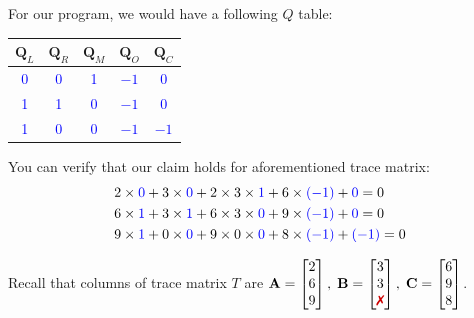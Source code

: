 \documentclass[../../book.tex]{subfiles}
\begin{document}
\begin{example}

For our program, we would have a following $Q$ table:
\begin{center}
\begin{tabular}{|c|c|c|c|c|}
\hline
\rowcolor{gray!30}$\mathbf{Q}_L$ & $\mathbf{Q}_R$ & $\mathbf{Q}_M$ & $\mathbf{Q}_O$ & $\mathbf{Q}_C$ \\ 
\hline
\textcolor{blue}{0} & \textcolor{blue}{0} & \textcolor{blue}{1} & \textcolor{blue}{$-1$} & \textcolor{blue}{0} \\ 
\hline
\textcolor{blue}{1} & \textcolor{blue}{1} & \textcolor{blue}{0} & \textcolor{blue}{$-1$} & \textcolor{blue}{0} \\ 
\hline
\textcolor{blue}{1} & \textcolor{blue}{0} & \textcolor{blue}{0} & \textcolor{blue}{$-1$} & \textcolor{blue}{$-1$} \\ 
\hline
\end{tabular}
\end{center}

You can verify that our claim holds for aforementioned trace matrix:
\begin{align*}
  &2 \times \textcolor{blue}{0} + 3 \times \textcolor{blue}{0} + 2 \times 3 \times \textcolor{blue}{1} + 6 \times \textcolor{blue}{(-1)} + \textcolor{blue}{0} = 0 \\
  &6 \times \textcolor{blue}{1} + 3 \times \textcolor{blue}{1} + 6 \times 3 \times \textcolor{blue}{0} + 9 \times \textcolor{blue}{(-1)} + \textcolor{blue}{0} = 0 \\
  &9 \times \textcolor{blue}{1} + 0 \times \textcolor{blue}{0} + 9 \times 0 \times \textcolor{blue}{0} + 8 \times \textcolor{blue}{(-1)} + \textcolor{blue}{(-1)} = 0 
\end{align*}

Recall that columns of trace matrix $T$ are $\mathbf{A} = \begin{bmatrix} 2 \\ 6 \\ 9 \end{bmatrix}, \;\mathbf{B} = \begin{bmatrix} 3 \\ 3 \\ \text{\xmark} \end{bmatrix}, \;\mathbf{C} = \begin{bmatrix} 6 \\ 9 \\ 8 \end{bmatrix}$.

\end{example}
\end{document}
